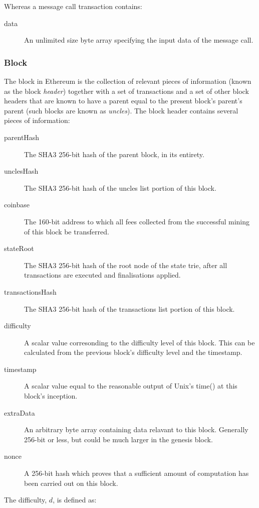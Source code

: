 \documentclass[9pt,oneside]{amsart}
\begin{document}
\begin{multicols}{2}
Whereas a message call transaction contains:

\begin{description}
\item[data] An unlimited size byte array specifying the input data of the message call.
\end{description}


\subsubsection{Block} \label{ch:block}

The block in Ethereum is the collection of relevant pieces of information (known as the block \textit{header}) together with a set of transactions and a set of other block headers that are known to have a parent equal to the present block's parent's parent (such blocks are known as \textit{uncles}). The block header contains several pieces of information:

\begin{description}
\item[parentHash] The SHA3 256-bit hash of the parent block, in its entirety.
\item[unclesHash] The SHA3 256-bit hash of the uncles list portion of this block.
\item[coinbase] The 160-bit address to which all fees collected from the successful mining of this block be transferred.
\item[stateRoot] The SHA3 256-bit hash of the root node of the state trie, after all transactions are executed and finalisations applied.
\item[transactionsHash] The SHA3 256-bit hash of the transactions list portion of this block.
\item[difficulty] A scalar value corresonding to the difficulty level of this block. This can be calculated from the previous block's difficulty level and the timestamp.
\item[timestamp] A scalar value equal to the reasonable output of Unix's time() at this block's inception.
\item[extraData] An arbitrary byte array containing data relavant to this block. Generally 256-bit or less, but could be much larger in the genesis block.
\item[nonce] A 256-bit hash which proves that a sufficient amount of computation has been carried out on this block.
\end{description}

The difficulty, $d$, is defined as:


\end{multicols}
\end{document}
